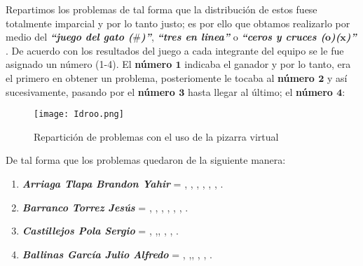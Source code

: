 \documentclass[12pt]{article}
\begin{document}
\textsf
Repartimos los problemas de tal forma que la distribución de estos fuese totalmente imparcial y por lo tanto justo; es por ello que obtamos realizarlo por medio del \textit{\textbf{``juego del gato ($\#$)''}}, \textit{\textbf{``tres en linea''}} o \textit{\textbf{``ceros y cruces ($\textbf{o}$)($\textbf{x}$)''}} . De acuerdo con los resultados del juego a cada integrante del equipo se le fue asignado un número (1-4). El \textbf{número $\textbf{1}$} indicaba el ganador y por lo tanto, era el primero en obtener un problema, posteriomente le tocaba al \textbf{número $\textbf{2}$} y así sucesivamente, pasando por el \textbf{número $\textbf{3}$} hasta llegar al último; el  \textbf{número $\textbf{4}$}:  \par 

\begin{figure}[htb] 
\centering \texttt{[image: Idroo.png]} 
\caption{Repartición de problemas con el uso de la pizarra virtual }
\end{figure}
\textsf
De tal forma que los problemas quedaron de la siguiente manera:
\begin{enumerate}
\item \textbf{\textit{Arriaga Tlapa Brandon Yahir}} = {}{}, {}{}, {}{},  {}{}, {}{}, {}{}, {}{}.
\item \textbf{\textit{Barranco Torrez Jesús}} = {}{}, {}{}, {}{}, {}{}, {}{}, {}{}, {}{}.
\item \textbf{\textit{Castillejos Pola Sergio}} = {}{}, {}{},{}{}, {}{}, {}{}, {}{}.
\item \textbf{\textit{Ballinas García Julio Alfredo}} = {}{}, {}{},{}{}, {}{}, {}{}, {}{}.
\end{enumerate}
\end{document}
